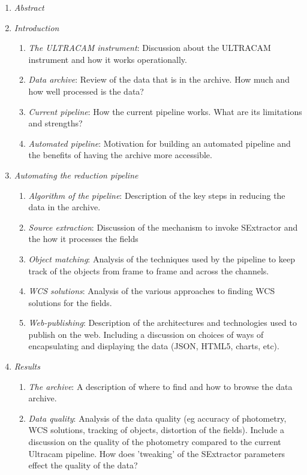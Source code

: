 \documentclass[a4paper,10pt]{article}
\begin{document}
\begin{enumerate}
	\item \emph{Abstract}
	\item \emph{Introduction} 
	\begin{enumerate}
	      \item \emph{The ULTRACAM instrument}: Discussion about the ULTRACAM instrument and how it works operationally. 
	      \item \emph{Data archive}: Review of the data that is in the archive. How much and how well processed is the data? 
	      \item \emph{Current pipeline}: How the current pipeline works. What are its limitations and strengths?
	      \item \emph{Automated pipeline}: Motivation for building an automated pipeline and the benefits of having the archive more accessible. 
	\end{enumerate}
	\item \emph{Automating the reduction pipeline} 
	\begin{enumerate}
	      \item \emph{Algorithm of the pipeline}: Description of the key steps in reducing the data in the archive. 
	      \item \emph{Source extraction}: Discussion of the mechanism to invoke SExtractor and the how it processes the fields 
	      \item \emph{Object matching}: Analysis of the techniques used by the pipeline to keep track of the objects from frame to frame and across the channels. 
	      \item \emph{WCS solutions}: Analysis of the various approaches to finding WCS solutions for the fields. 
	      \item \emph{Web-publishing}: Description of the architectures and technologies used to publish on the web. Including a discussion on choices of ways of encapsulating and displaying the data (JSON, HTML5, charts, etc).
	\end{enumerate}
	\item \emph{Results}
	\begin{enumerate}
	      \item \emph{The archive}: A description of where to find and how to browse the data archive. 
	      \item \emph{Data quality}: Analysis of the data quality (eg accuracy of photometry, WCS solutions, tracking of objects, distortion of the fields). Include a discussion on the quality of the photometry compared to the current Ultracam pipeline. How does 'tweaking' of the SExtractor parameters effect the quality of the data? 

\end{enumerate}
\end{enumerate}
\end{document}
